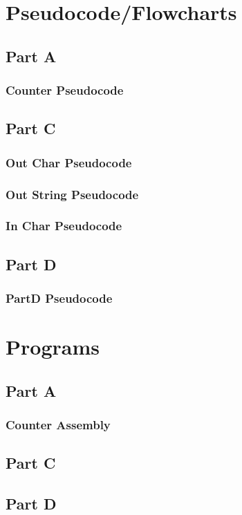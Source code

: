 \documentclass[letterpaper, 12pt]{article}
\begin{document}
\section*{Pseudocode/Flowcharts}
\subsection*{Part A}
\subsubsection*{Counter Pseudocode}

\subsection*{Part C}
\subsubsection*{Out Char Pseudocode}

\subsubsection*{Out String Pseudocode}

\subsubsection*{In Char Pseudocode}

\subsection*{Part D}
\subsubsection*{PartD Pseudocode}

\section*{Programs}
\subsection*{Part A}
\subsubsection*{Counter Assembly}

\subsection*{Part C}

\subsection*{Part D}

\end{document}
